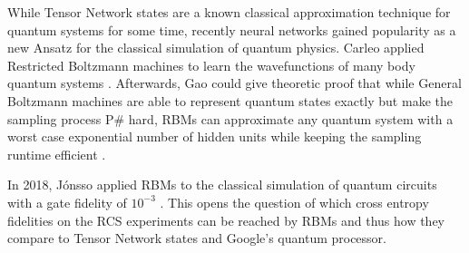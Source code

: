 While Tensor Network states are a known classical approximation technique for quantum systems for 
some time, recently neural networks gained popularity as a new Ansatz for the classical simulation
of quantum physics. Carleo applied Restricted Boltzmann machines to learn the wavefunctions of many body 
quantum systems \cite{Carleo_2017}. Afterwards, Gao could give theoretic proof that while General 
Boltzmann machines are able to represent quantum states exactly but make the sampling process P\#
hard, RBMs can approximate any quantum system with a worst case exponential number of hidden units while keeping the 
sampling runtime efficient \cite{Gao_2017}.

In 2018, Jónsso applied RBMs to the classical simulation of 
quantum circuits with a gate fidelity of $10^{-3}$ \cite{jnsson2018neuralnetwork}. This opens the question of which 
cross entropy fidelities on the RCS experiments can be reached by RBMs and thus how they compare to 
Tensor Network states and Google's quantum processor.